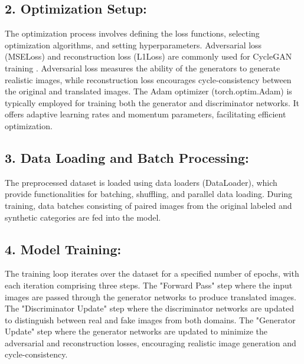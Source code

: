 \documentclass[UKenglish,12pt]{master-style}
\begin{document}
\subsection*{2. Optimization Setup:}
The optimization process involves defining the loss functions, selecting optimization algorithms, and setting hyperparameters. Adversarial loss (MSELoss) and reconstruction loss (L1Loss) are commonly used for CycleGAN training \cite{CaGAN} . Adversarial loss measures the ability of the generators to generate realistic images, while reconstruction loss encourages cycle-consistency between the original and translated images.
The Adam optimizer (torch.optim.Adam) is typically employed for training both the generator and discriminator networks. It offers adaptive learning rates and momentum parameters, facilitating efficient optimization.

\subsection*{3. Data Loading and Batch Processing:}
The preprocessed dataset is loaded using data loaders (DataLoader), which provide functionalities for batching, shuffling, and parallel data loading. During training, data batches consisting of paired images from the original labeled and synthetic categories are fed into the model.

\subsection*{4. Model Training:}

The training loop iterates over the dataset for a specified number of epochs, with each iteration comprising three steps. The "Forward Pass" step where the input images are passed through the generator networks to produce translated images. The "Discriminator Update" step where the discriminator networks are updated to distinguish between real and fake images from both domains. The "Generator Update" step where the generator networks are updated to minimize the adversarial and reconstruction losses, encouraging realistic image generation and cycle-consistency.
\end{document}

